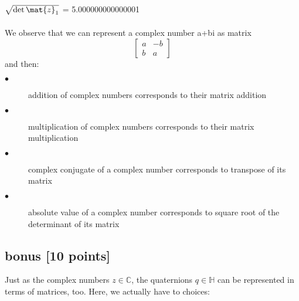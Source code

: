 $\sqrt{\det{\mat{z}_1}}$ = 5.000000000000001 \\ \\
We observe that we can represent a complex number a+bi as matrix $$\begin{bmatrix} a & -b \\ b & a \end{bmatrix}$$ and then:
\begin{description}
  \item[$\bullet$] addition of complex numbers corresponds to their matrix addition
  \item[$\bullet$] multiplication of complex numbers corresponds to their matrix multiplication
  \item[$\bullet$] complex conjugate of a complex number corresponds to transpose of its matrix
  \item[$\bullet$] absolute value of a complex number corresponds to square root of the determinant of its matrix
\end{description}

\color{black}
\newpage





\subsection*{bonus [10 points]}
Just as the complex numbers $z \in \mathbb{C}$, the quaternions $q \in \mathbb{H}$ can be represented in terms of matrices, too. Here, we actually have to choices: 

